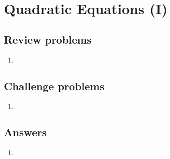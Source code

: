 \section{Quadratic Equations (I)}

\subsection{Review problems}

\begin{enumerate}
\item 
\end{enumerate}


\subsection{Challenge problems}

\begin{enumerate}[resume]
\item 
\end{enumerate}


\subsection{Answers}

\begin{enumerate}
\item 
\end{enumerate}